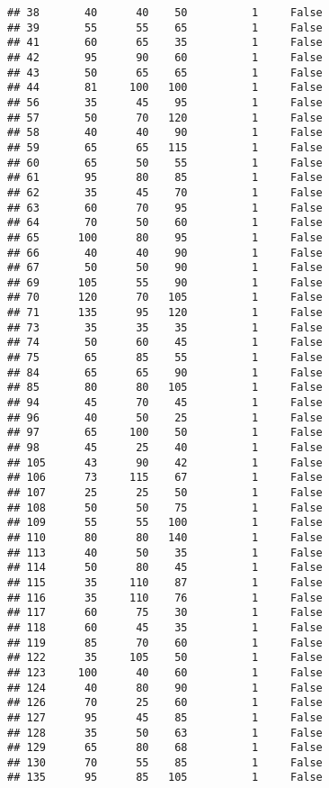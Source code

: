 \documentclass[
]{article}
\begin{document}
\begin{verbatim}
## 38       40      40    50          1     False
## 39       55      55    65          1     False
## 41       60      65    35          1     False
## 42       95      90    60          1     False
## 43       50      65    65          1     False
## 44       81     100   100          1     False
## 56       35      45    95          1     False
## 57       50      70   120          1     False
## 58       40      40    90          1     False
## 59       65      65   115          1     False
## 60       65      50    55          1     False
## 61       95      80    85          1     False
## 62       35      45    70          1     False
## 63       60      70    95          1     False
## 64       70      50    60          1     False
## 65      100      80    95          1     False
## 66       40      40    90          1     False
## 67       50      50    90          1     False
## 69      105      55    90          1     False
## 70      120      70   105          1     False
## 71      135      95   120          1     False
## 73       35      35    35          1     False
## 74       50      60    45          1     False
## 75       65      85    55          1     False
## 84       65      65    90          1     False
## 85       80      80   105          1     False
## 94       45      70    45          1     False
## 96       40      50    25          1     False
## 97       65     100    50          1     False
## 98       45      25    40          1     False
## 105      43      90    42          1     False
## 106      73     115    67          1     False
## 107      25      25    50          1     False
## 108      50      50    75          1     False
## 109      55      55   100          1     False
## 110      80      80   140          1     False
## 113      40      50    35          1     False
## 114      50      80    45          1     False
## 115      35     110    87          1     False
## 116      35     110    76          1     False
## 117      60      75    30          1     False
## 118      60      45    35          1     False
## 119      85      70    60          1     False
## 122      35     105    50          1     False
## 123     100      40    60          1     False
## 124      40      80    90          1     False
## 126      70      25    60          1     False
## 127      95      45    85          1     False
## 128      35      50    63          1     False
## 129      65      80    68          1     False
## 130      70      55    85          1     False
## 135      95      85   105          1     False

\end{verbatim}
\end{document}
